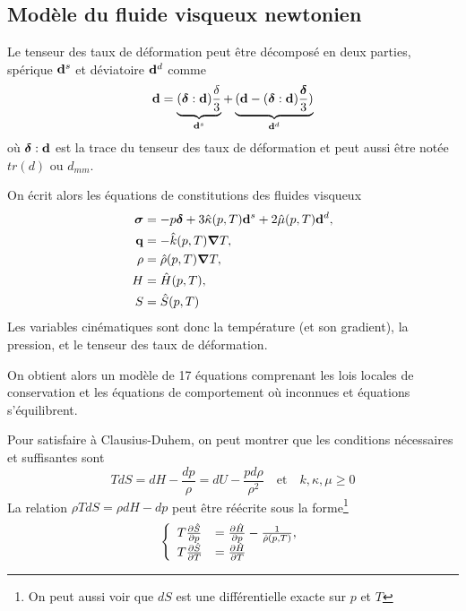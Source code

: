 \documentclass[a4paper,11pt]{report}
\newcommand{\bs}[1]{\boldsymbol{#1}}
\newcommand{\recip}[1]{\frac{1}{#1}}
\begin{document}
    \subsection{Modèle du fluide visqueux newtonien}
      Le tenseur des taux de déformation peut être décomposé en deux parties, spérique $\vb{d}^s$ et déviatoire $\vb{d}^d$ comme
      \begin{equation}
        \vb{d} = \underbrace{(\bs{\delta} : \vb{d}) \frac{\delta}{3}}_{\vb{d}^s} + \underbrace{(\vb{d} - (\bs{\delta}:\vb{d})\frac{\bs{\delta}}{3})}_{\vb{d}^d}
      \end{equation}
      où $\bs{\delta} : \vb{d}$ est la trace du tenseur des taux de déformation et peut aussi être notée $tr(d)$ ou $d_{mm}$.

      On écrit alors les équations de constitutions des fluides visqueux
      \begin{equation}
        \begin{aligned}
          \bs{\sigma} &= -p\bs{\delta} + 3 \hat{\kappa}(p,T) \vb{d}^s + 2 \hat{\mu}(p,T) \vb{d}^d,\\
          \vb{q} &= - \hat{k}(p, T) \grad T,\\
          \rho &= \hat{\rho}(p,T)\grad T,\\
          H &= \hat{H}(p,T),\\
          S &= \hat{S}(p,T)
        \end{aligned}
      \end{equation}
      Les variables cinématiques sont donc la température (et son gradient), la pression, et le tenseur des taux de déformation.

      On obtient alors un modèle de 17 équations comprenant les lois locales de conservation et les équations de comportement où inconnues et équations s'équilibrent.

      Pour satisfaire à Clausius-Duhem, on peut montrer que les conditions nécessaires et suffisantes sont
      \begin{equation}
        TdS = dH - \frac{dp}{\rho} = dU - \frac{pd\rho}{\rho^2}\quad \textrm{et} \quad k, \kappa, \mu \geq 0
      \end{equation}
      La relation $\rho T dS = \rho dH - dp$ peut être réécrite sous la forme\footnote{On peut aussi voir que $dS$ est une différentielle exacte sur $p$ et $T$}
      \begin{equation}
        \left\{
          \begin{array}{ll}
            T \pdv{\hat{S}}{p}(p,T) &= \pdv{\hat{H}}{p}(p, T) - \recip{\hat{\rho}(p,T)},\\
            T \pdv{\hat{S}}{T}(p,T) &= \pdv{\hat{H}}{T}(p,T)
          \end{array}
        \right.
      \end{equation}
\end{document}

